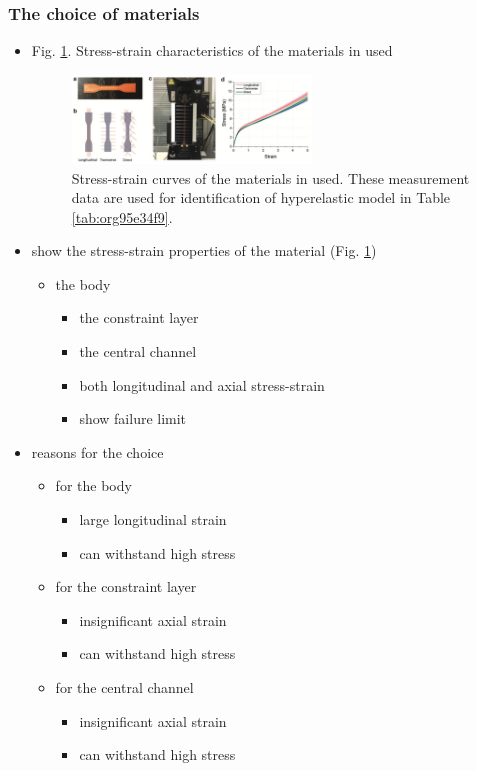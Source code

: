 \documentclass[journal,onecolumn]{IEEEtran}
\begin{document}
\subsubsection{The choice of materials}
\label{sec:org9591329}

\begin{itemize}
\item Fig. \ref{fig:orge39dc7f}. Stress-strain characteristics of the materials in used 

\begin{figure}[!h]
\centering
\includegraphics[width=0.6\textwidth]{./fig/fig-stress_strain_material.png}
\caption{\label{fig:orge39dc7f}
Stress-strain curves of the materials in used. These measurement data are used for identification of hyperelastic model in Table \ref{tab:org95e34f9}.}
\end{figure}
\end{itemize}


\begin{itemize}
\item show the stress-strain properties of the material (Fig. \ref{fig:orge39dc7f})
\begin{itemize}
\item the body
\begin{itemize}
\item the constraint layer
\item the central channel
\item both longitudinal and axial stress-strain
\item show failure limit
\end{itemize}
\end{itemize}
\item reasons for the choice
\begin{itemize}
\item for the body
\begin{itemize}
\item large longitudinal strain
\item can withstand high stress
\end{itemize}
\item for the constraint layer
\begin{itemize}
\item insignificant axial strain
\item can withstand high stress
\end{itemize}
\item for the central channel
\begin{itemize}
\item insignificant axial strain
\item can withstand high stress
\end{itemize}
\end{itemize}
\end{itemize}
\end{document}
